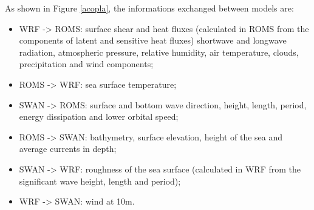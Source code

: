  As shown in Figure \textcolor{bleu_cite}{\ref{acopla}}, the informations exchanged between models are:
\bigskip

\begin{itemize}
\item WRF -> ROMS: surface shear and heat fluxes (calculated in ROMS from the components of latent and sensitive heat fluxes) shortwave and longwave radiation, atmospheric pressure, relative humidity, air temperature, clouds, precipitation and wind components;
\item ROMS -> WRF: sea surface temperature;
\item SWAN -> ROMS: surface and bottom wave direction, height, length, period, energy dissipation and lower orbital speed;
\item ROMS -> SWAN: bathymetry, surface elevation, height of the sea and average currents in depth;
\item SWAN -> WRF: roughness of the sea surface (calculated in WRF from the significant wave height, length and period);
\item WRF -> SWAN: wind at 10m.
\end{itemize}
\bigskip

